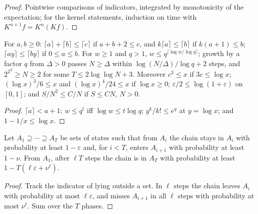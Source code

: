 \begin{proof}\leanok
Pointwise comparisons of indicators, integrated by monotonicity of the expectation;
for the kernel statements, induction on time with $K^{n+1}f=K^n(Kf)$.
\end{proof}
\begin{lemma}\label{lem:scalar}
\leanok
For $a,b\ge0$: $\lceil a\rceil+\lceil b\rceil\le\lceil c\rceil$ if $a+b+2\le c$, and
$k\lceil a\rceil\le\lceil b\rceil$ if $k(a+1)\le b$; $\lceil ay\rceil\le\lceil by\rceil$ if
$0\le a\le b$. For $w\ge1$ and $q>1$,
$w\le q^{\lceil\log w/\log q\rceil}$; growth by a factor $q$ from $\Delta>0$ passes
$N\ge\Delta$ within $\log(N/\Delta)/\log q+2$ steps, and $2^{2^T}\ge N\ge2$ for some
$T\le2\log\log N+3$. Moreover $c^3\le x$ if $3c\le\log x$; $(\log x)^3/6\le x$ and
$(\log x)^4/24\le x$ if $\log x\ge0$; $\varepsilon/2\le\log(1+\varepsilon)$ on $[0,1]$;
and $S/N^2\le C/N$ if $S\le CN$, $N>0$.
\end{lemma}
\begin{proof}\leanok
$\lceil a\rceil<a+1$; $w\le q^t$ iff $\log w\le t\log q$; $y^k/k!\le e^y$ at $y=\log x$; and
$1-1/x\le\log x$.
\end{proof}
\begin{theorem}\label{thm:phases}
\leanok{}
Let $A_1\supseteq\cdots\supseteq A_T$ be sets of states such that from $A_i$
the chain stays in $A_i$ with probability at least $1-\varepsilon$ and, for
$i<T$, enters $A_{i+1}$ with probability at least $1-\nu$. From $A_1$, after
$\ell T$ steps the chain is in $A_T$ with probability at least
$1-T(\ell\varepsilon+\nu^\ell)$.
\end{theorem}
\begin{proof}\leanok
Track the indicator of lying outside a set. In $\ell$ steps the chain leaves
$A_i$ with probability at most $\ell\varepsilon$, and misses $A_{i+1}$ in all
$\ell$ steps with probability at most $\nu^\ell$. Sum over the $T$ phases.
\end{proof}
